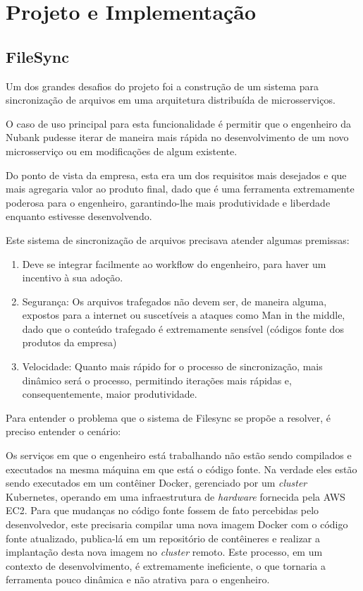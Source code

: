 \chapter{Projeto e Implementação}

	\section{FileSync}

	Um dos grandes desafios do projeto foi a construção de um sistema para sincronização de arquivos em uma arquitetura distribuída de microsserviços.
	
	O caso de uso principal para esta funcionalidade é permitir que o engenheiro da Nubank pudesse iterar de maneira mais rápida no desenvolvimento de um novo microsserviço ou em modificações de algum existente.
	
	Do ponto de vista da empresa, esta era um dos requisitos mais desejados e que mais agregaria valor ao produto final, dado que é uma ferramenta extremamente poderosa para o engenheiro, garantindo-lhe mais produtividade e liberdade enquanto estivesse desenvolvendo.
	
	Este sistema de sincronização de arquivos precisava atender algumas premissas:
	
	
	\begin{enumerate}
        \item Deve se integrar facilmente ao workflow do engenheiro, para haver um incentivo à sua adoção.
        \item Segurança: Os arquivos trafegados não devem ser, de maneira alguma, expostos para a internet ou suscetíveis a ataques como Man in the middle, dado que o conteúdo trafegado é extremamente sensível (códigos fonte dos produtos da empresa)
        \item Velocidade: Quanto mais rápido for o processo de sincronização, mais dinâmico será o processo, permitindo iterações mais rápidas e, consequentemente, maior produtividade.
    \end{enumerate}

	Para entender o problema que o sistema de Filesync se propõe a resolver, é preciso entender o cenário:
	
	Os serviços em que o engenheiro está trabalhando não estão sendo compilados e executados na mesma máquina em que está o código fonte. Na verdade eles estão sendo executados em um contêiner Docker, gerenciado por um \textit{cluster} Kubernetes, operando em uma infraestrutura de \textit{hardware} fornecida pela AWS EC2. Para que mudanças no código fonte fossem de fato percebidas pelo desenvolvedor, este precisaria compilar uma nova imagem Docker com o código fonte atualizado, publica-lá em um repositório de contêineres e realizar a implantação desta nova imagem no \textit{cluster} remoto. Este processo, em um contexto de desenvolvimento, é extremamente ineficiente, o que tornaria a ferramenta pouco dinâmica e não atrativa para o engenheiro.

